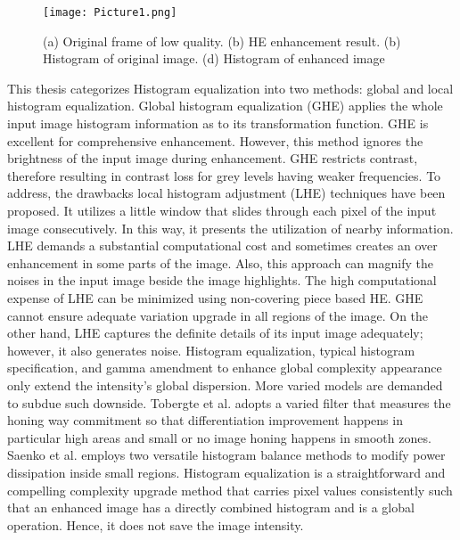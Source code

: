 \documentclass[doctor,english,listoffigures,listoftables]{thesis-uestc}
\begin{document}
\begin{figure}[!htb]
	\centering
	\texttt{[image: Picture1.png]}
	\caption{(a) Original frame of low quality. (b) HE enhancement result. (b) Histogram of original image. (d) Histogram of enhanced image}
	\label{11}
\end{figure}
This thesis categorizes Histogram equalization into two methods: global and local histogram equalization. Global histogram equalization (GHE) applies the whole input image histogram information as to its transformation function. GHE is excellent for comprehensive enhancement. However, this method ignores the brightness of the input image during enhancement. GHE restricts contrast, therefore resulting in contrast loss for grey levels having weaker frequencies. To address, the drawbacks local histogram adjustment (LHE) techniques have been proposed. It utilizes a little window that slides through each pixel of the input image consecutively.  In this way, it presents the utilization of nearby information. LHE demands a substantial computational cost and sometimes creates an over enhancement in some parts of the image. Also, this approach can magnify the noises in the input image beside the image highlights. The high computational expense of LHE can be minimized using non-covering piece based HE. GHE cannot ensure adequate variation upgrade in all regions of the image. On the other hand, LHE captures the definite details of its input image adequately; however, it also generates noise. Histogram equalization, typical histogram specification, and gamma amendment to enhance global complexity appearance only extend the intensity's global dispersion. More varied models are demanded to subdue such downside. Tobergte et al. adopts a varied filter that measures the honing way commitment so that differentiation improvement happens in particular high areas and small or no image honing happens in smooth zones. Saenko et al. employs two versatile histogram balance methods to modify power dissipation inside small regions. Histogram equalization is a straightforward and compelling complexity upgrade method that carries pixel values consistently such that an enhanced image has a directly combined histogram and is a global operation. Hence, it does not save the image intensity. 
\end{document}

